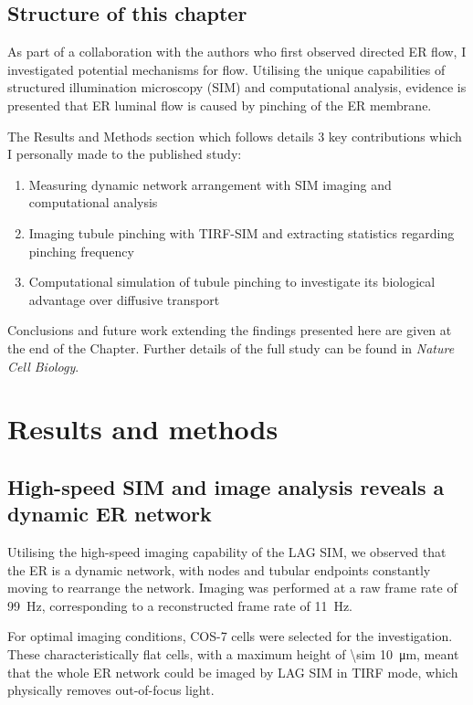 \subsection{Structure of this chapter}
As part of a collaboration with the authors who first observed directed ER flow, I investigated potential mechanisms for flow. 
Utilising the unique capabilities of structured illumination microscopy (SIM) and computational analysis, evidence is presented that ER luminal flow is caused by pinching of the ER membrane.

The Results and Methods section which follows details 3 key contributions which I personally made to the published study:
\begin{enumerate}
	\item Measuring dynamic network arrangement with SIM imaging and computational analysis
	\item Imaging tubule pinching with TIRF-SIM and extracting statistics regarding pinching frequency
	\item Computational simulation of tubule pinching to investigate its biological advantage over diffusive transport
\end{enumerate}

Conclusions and future work extending the findings presented here are given at the end of the Chapter. 
Further details of the full study can be found in \textit{Nature Cell Biology}. 

\section{Results and methods} \label{sec:ERresults}
\subsection{High-speed SIM and image analysis reveals a dynamic ER network} \label{sec:ERnetwork}
Utilising the high-speed imaging capability of the LAG SIM, we  observed that the ER is a dynamic network, with nodes and tubular endpoints constantly moving to rearrange the network. 
Imaging was performed at a raw frame rate of \SI{99}{\hertz}, corresponding to a reconstructed frame rate of \SI{11}{\hertz}. 

For optimal imaging conditions, COS-7 cells were selected for the investigation. 
These characteristically flat cells, with a maximum height of \SI{\sim 10}{\micro\meter}, %
meant that the whole ER network could be imaged by LAG SIM in TIRF mode, which physically removes out-of-focus light. %

